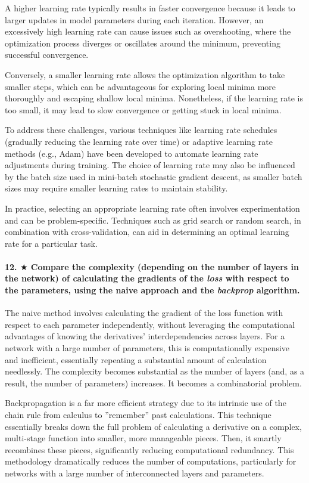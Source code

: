 A higher learning rate typically results in faster convergence because it leads to larger updates in model parameters during each iteration. However, an excessively high learning rate can cause issues such as overshooting, where the optimization process diverges or oscillates around the minimum, preventing successful convergence.

Conversely, a smaller learning rate allows the optimization algorithm to take smaller steps, which can be advantageous for exploring local minima more thoroughly and escaping shallow local minima. Nonetheless, if the learning rate is too small, it may lead to slow convergence or getting stuck in local minima.

To address these challenges, various techniques like learning rate schedules (gradually reducing the learning rate over time) or adaptive learning rate methods (e.g., Adam) have been developed to automate learning rate adjustments during training. The choice of learning rate may also be influenced by the batch size used in mini-batch stochastic gradient descent, as smaller batch sizes may require smaller learning rates to maintain stability.

In practice, selecting an appropriate learning rate often involves experimentation and can be problem-specific. Techniques such as grid search or random search, in combination with cross-validation, can aid in determining an optimal learning rate for a particular task.

\paragraph{12. $\bigstar$ Compare the complexity (depending on the number of layers in the network) of calculating the gradients of the \textit{loss} with respect to the parameters, using the naive approach and the \textit{backprop} algorithm.}
The naive method involves calculating the gradient of the loss function with respect to each parameter independently, without leveraging the computational advantages of knowing the derivatives' interdependencies across layers. For a network with a large number of parameters, this is computationally expensive and inefficient, essentially repeating a substantial amount of calculation needlessly. The complexity becomes substantial as the number of layers (and, as a result, the number of parameters) increases. It becomes a combinatorial problem.

Backpropagation is a far more efficient strategy due to its intrinsic use of the chain rule from calculus to ''remember'' past calculations. This technique essentially breaks down the full problem of calculating a derivative on a complex, multi-stage function into smaller, more manageable pieces. Then, it smartly recombines these pieces, significantly reducing computational redundancy. This methodology dramatically reduces the number of computations, particularly for networks with a large number of interconnected layers and parameters.

